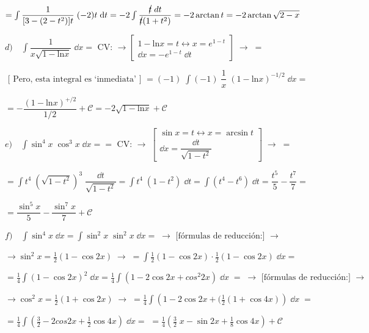 {\begin{proofw}
$=\int \dfrac {1}{[3-(2-t^2)] t}\; (-2)t\; \dd t = -2 \int \dfrac {\cancel{t}\; dt}{\cancel{t}(1+t^2)} = -2 \arctan t = -2 \arctan {\sqrt{2-x}}$

\vspace{4mm}
$d) \quad \displaystyle \int \dfrac {1}{x\sqrt{1-\mathrm{ln}x}} \; \dd x  = \text { CV: } \to \left[ \begin{matrix}
 1-\mathrm{ln} x = t \leftrightarrow x=e^{1-t} \\ 
 \dd x = - e^{1-t} \; \dd t 
 \end{matrix} \right]  \; \to \; = $

 $\text{ [ Pero, esta integral es `inmediata' ] } =\displaystyle (-1)\; \int (-1)\; \dfrac {1}{x}\; (1-\mathrm{ln}x)^{-1/2} \; \dd x =$
 
 $=- \dfrac {(1-\mathrm{ln}x)^{+/2}}{1/2} +\mathcal C = -2 \sqrt{1-\mathrm{ln}x}+\mathcal C$	

\vspace{4mm}
$e) \quad \displaystyle \int \sin^4 x \; \cos^3 x \; \dd x= = \text { CV: } \to \; \left[ \begin{matrix}  
    \sin x =t \leftrightarrow x=\arcsin t        \\  
    \dd x = \dfrac {\dd t}{\sqrt{1-t^2}}
   \end{matrix} \right] \; \to \; =$
   
   $= \int t^4 \; (\sqrt{1-t^2})^3 \; \dfrac {\dd t}{\sqrt{1-t^2}} = \int t^4 \; (1-t^2)\; \dd t= \int (t^4-t^6)\; \dd t = \dfrac {t^5}{5} - \dfrac {t^7}{7}=$
   
   $= \dfrac {\sin^5 x}{5} - \dfrac {\sin^7 x}{7}+\mathcal C$	



\vspace{4mm}
$f) \quad \displaystyle \int \sin^4 x \; \dd x = \int \sin^2 x \;\sin^2 x \; \dd x =\;  \to \text{ [fórmulas de reducción:] } \to $

$\to  \sin^2 x = \frac 1 2 (1-\cos 2x) \; \to \; =\int  \frac 1 2 (1-\cos 2x) \cdot \frac 1 2 (1-\cos 2x)  \; \dd x =$

$= \frac 1 4 \int (1-\cos 2x)^2 \; \dd x = \frac 1 4 \int (1-2\cos 2x + cos^2 2x) \; \dd x \; = \; \to \text{ [fórmulas de reducción:] }\to $

$ \to \cos^2 x = \frac 1 2 (1+\cos 2x) \; \to \; =  \frac 1 4 \int \left( 1-2\cos 2x + (\frac 1 2 (1+\cos 4x) \right) \; \dd x \; =$ 

$=\frac 1 4 \int ( \frac 3 2 - 2 cos 2x +\frac 1 2 \cos 4x)\; \dd x= $
$=\displaystyle \frac 1 4 \left(\frac 3 2 \; x - \sin 2x + \frac 1 8 \cos 4x \right)+\mathcal C$


\end{proofw}}
